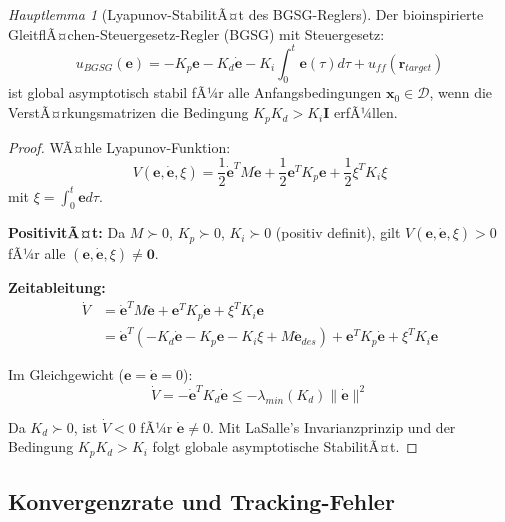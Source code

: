 ﻿\documentclass[12pt,a4paper]{article}
\theoremstyle{remark}
\newtheorem{hauptlemma}{Hauptlemma}[section]
\begin{document}
	\begin{hauptlemma}[Lyapunov-StabilitÃ¤t des BGSG-Reglers]\label{lem:lyap}
		Der bioinspirierte GleitflÃ¤chen-Steuergesetz-Regler (BGSG) mit Steuergesetz:
		\begin{equation}
			u_{BGSG}(\mathbf{e}) = -K_p \mathbf{e} - K_d \dot{\mathbf{e}} - K_i \int_0^t \mathbf{e}(\tau) d\tau + u_{ff}(\mathbf{r}_{target})
			\label{eq:bgsg}
		\end{equation}
		ist global asymptotisch stabil fÃ¼r alle Anfangsbedingungen $\mathbf{x}_0 \in \mathcal{D}$, wenn die VerstÃ¤rkungsmatrizen die Bedingung $K_p K_d > K_i \mathbf{I}$ erfÃ¼llen.
	\end{hauptlemma}
	
	\begin{proof}
		WÃ¤hle Lyapunov-Funktion:
		\begin{equation}
			V(\mathbf{e}, \dot{\mathbf{e}}, \xi) = \frac{1}{2}\dot{\mathbf{e}}^T M \dot{\mathbf{e}} + \frac{1}{2}\mathbf{e}^T K_p \mathbf{e} + \frac{1}{2}\xi^T K_i \xi
			\label{eq:lyapunov}
		\end{equation}
		mit $\xi = \int_0^t \mathbf{e}d\tau$.
		
		\textbf{PositivitÃ¤t:} Da $M \succ 0$, $K_p \succ 0$, $K_i \succ 0$ (positiv definit), gilt $V(\mathbf{e}, \dot{\mathbf{e}}, \xi) > 0$ fÃ¼r alle $(\mathbf{e}, \dot{\mathbf{e}}, \xi) \neq \mathbf{0}$.
		
		\textbf{Zeitableitung:}
		\begin{align}
			\dot{V} &= \dot{\mathbf{e}}^T M \ddot{\mathbf{e}} + \mathbf{e}^T K_p \dot{\mathbf{e}} + \xi^T K_i \mathbf{e} \\
			&= \dot{\mathbf{e}}^T \left(- K_d \dot{\mathbf{e}} - K_p \mathbf{e} - K_i \xi + M\ddot{\mathbf{e}}_{des}\right) + \mathbf{e}^T K_p \dot{\mathbf{e}} + \xi^T K_i \mathbf{e}
		\end{align}
		
		Im Gleichgewicht ($\mathbf{e} = \dot{\mathbf{e}} = 0$):
		\begin{equation}
			\dot{V} = -\dot{\mathbf{e}}^T K_d \dot{\mathbf{e}} \leq -\lambda_{min}(K_d) \|\dot{\mathbf{e}}\|^2
		\end{equation}
		
		Da $K_d \succ 0$, ist $\dot{V} < 0$ fÃ¼r $\dot{\mathbf{e}} \neq 0$. Mit LaSalle's Invarianzprinzip und der Bedingung $K_p K_d > K_i$ folgt globale asymptotische StabilitÃ¤t.
	\end{proof}
	
	\subsection{Konvergenzrate und Tracking-Fehler}
	
\end{document}
